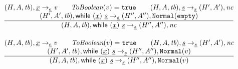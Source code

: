 \documentclass[a4paper, leqno]{amsart}
\newcommand{\rulesep}{\quad\quad}
\newcommand{\stmt}{s}
\newcommand{\expr}{e}
\newcommand{\ir}[1]{\ensuremath{\underline{#1}}}
\newcommand{\irid}{\ir{x}}
\newcommand{\true}{{\tt true}}
\newcommand{\tb}{\emph{tb}}
\newcommand{\nc}{\emph{nc}}
\newcommand{\hf}[1]{\emph{#1}}
\newcommand{\void}{{\tt Normal}({\tt empty})}
\newcommand{\state}{\ensuremath{(H,A,\tb)}}
\newcommand{\statep}{\ensuremath{(H',A',\tb)}}
\newcommand{\statel}{\ensuremath{(H,A,\tb)}}
\newcommand{\resp}{\ensuremath{(H',A')}}
\newcommand{\respp}{\ensuremath{(H'',A'')}}
\newcommand{\evale}{\ensuremath{(H,A,\tb)}}
\newcommand{\irwhile}{\ensuremath{{\sf while} \ {\tt(}\irid{\tt)}\ \ir\stmt}}
\begin{document}
\[\begin{array}{l@{~~}l@{~~}ll}
\frac{\begin{matrix}
\evale, \irid \rightarrow_{\ir\expr} \emph{v} 
\rulesep
\hf{ToBoolean}(v) = \true
\rulesep
\statel, \ir\stmt \rightarrow_{\ir\stmt} \resp, \nc
\\
\statep, \irwhile \rightarrow_{\ir{\stmt}} \respp, \void
\end{matrix}}
{\begin{matrix}
\state, \irwhile \rightarrow_{\ir{\stmt}} \respp, \nc
\end{matrix}}
\\[2em]

\frac{\begin{matrix}
\evale, \irid \rightarrow_{\ir\expr} v
\rulesep
\hf{ToBoolean}(v) = \true
\rulesep
\statel, \ir\stmt \rightarrow_{\ir\stmt} \resp, \nc
\\
\statep, \irwhile \rightarrow_{\ir{\stmt}} \respp, {\tt Normal}(v)
\end{matrix}}
{\begin{matrix}
\state, \irwhile \rightarrow_{\ir{\stmt}} \respp, {\tt Normal}(v)
\end{matrix}}
\\[2em]


\end{array}
\]
\end{document}
